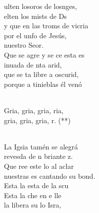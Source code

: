 \documentclass[12pt]{article}
\begin{document}
\begin{multicols*}{2}
\begin{cancion}%
	ulten losoros de losnges, \\
	elten los mists de Ds \\
	y que en las troms de vicria\\
	por el unfo de Jesús, \\
	nuestro Seor.\\
\jump
	Que se agre y se ce esta es\\
	inuada de nta arid, \\
	que se ta libre a oscurid,\\
	porque a  tinieblas él venó\\\jump\\
	\begin{chorus}%
	Gria, gria, gria, ria,\\
	gria, gria, gria, r. (**)\\
	\end{chorus}%
	\jump\\
	La Igsia tamén se alegrá\\
	revesda de n briante z.\\
	Que ree este lo al aclar\\
	nuestras es cantando su bond.\\
\jump
	Esta  la esta de la scu\\
	Esta  la che en e lle  \\
	la libera su lo Isra,\\

\end{cancion}
\end{multicols*}
\end{document}

